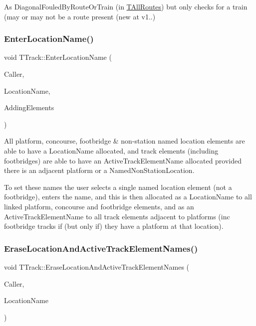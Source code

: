 As Diagonal\+Fouled\+By\+Route\+Or\+Train (in \mbox{\hyperlink{class_t_all_routes}{T\+All\+Routes}}) but only checks for a train (may or may not be a route present (new at v1..) \mbox{\label{class_t_track_a433736aed04f76b3d0c39f0696c3bb18}} 
\subsubsection{\texorpdfstring{Enter\+Location\+Name()}{EnterLocationName()}}
{\footnotesize\ttfamily void T\+Track\+::\+Enter\+Location\+Name (\begin{DoxyParamCaption}\item[{int}]{Caller,  }\item[{Ansi\+String}]{Location\+Name,  }\item[{bool}]{Adding\+Elements }\end{DoxyParamCaption})}

All platform, concourse, footbridge \& non-\/station named location elements are able to have a Location\+Name allocated, and track elements (including footbridges) are able to have an Active\+Track\+Element\+Name allocated provided there is an adjacent platform or a Named\+Non\+Station\+Location.

To set these names the user selects a single named location element (not a footbridge), enters the name, and this is then allocated as a Location\+Name to all linked platform, concourse and footbridge elements, and as an Active\+Track\+Element\+Name to all track elements adjacent to platforms (inc footbridge tracks if (but only if) they have a platform at that location). \mbox{\label{class_t_track_a13a1cc9770c8729d04ad4c0130f91634}} 
\subsubsection{\texorpdfstring{Erase\+Location\+And\+Active\+Track\+Element\+Names()}{EraseLocationAndActiveTrackElementNames()}}
{\footnotesize\ttfamily void T\+Track\+::\+Erase\+Location\+And\+Active\+Track\+Element\+Names (\begin{DoxyParamCaption}\item[{int}]{Caller,  }\item[{Ansi\+String}]{Location\+Name }\end{DoxyParamCaption})}

